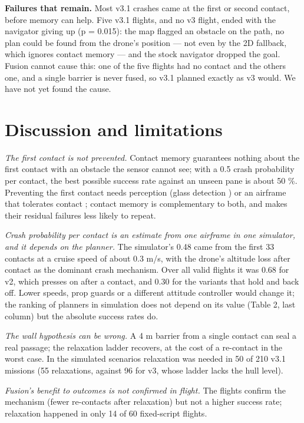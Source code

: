\documentclass[
]{article}
\begin{document}
\textbf{Failures that remain.} Most v3.1 crashes came at the first or
second contact, before memory can help. Five v3.1 flights, and no v3
flight, ended with the navigator giving up (p = 0.015): the map flagged
an obstacle on the path, no plan could be found from the drone's
position --- not even by the 2D fallback, which ignores contact memory
--- and the stock navigator dropped the goal. Fusion cannot cause this:
one of the five flights had no contact and the others one, and a single
barrier is never fused, so v3.1 planned exactly as v3 would. We have not
yet found the cause.

\section{Discussion and limitations}\label{discussion-and-limitations}

\emph{The first contact is not prevented.} Contact memory guarantees
nothing about the first contact with an obstacle the sensor cannot see;
with a 0.5 crash probability per contact, the best possible success rate
against an unseen pane is about 50 \%. Preventing the first contact
needs perception (glass detection \autocite{mei2020glass}) or an
airframe that tolerates contact \autocite{briod2014gimball}; contact
memory is complementary to both, and makes their residual failures less
likely to repeat.

\emph{Crash probability per contact is an estimate from one airframe in
one simulator, and it depends on the planner.} The simulator's 0.48 came
from the first 33 contacts at a cruise speed of about 0.3 m/s, with the
drone's altitude loss after contact as the dominant crash mechanism.
Over all valid flights it was 0.68 for v2, which presses on after a
contact, and 0.30 for the variants that hold and back off. Lower speeds,
prop guards or a different attitude controller would change it; the
ranking of planners in simulation does not depend on its value (Table 2,
last column) but the absolute success rates do.

\emph{The wall hypothesis can be wrong.} A 4 m barrier from a single
contact can seal a real passage; the relaxation ladder recovers, at the
cost of a re-contact in the worst case. In the simulated scenarios
relaxation was needed in 50 of 210 v3.1 missions (55 relaxations,
against 96 for v3, whose ladder lacks the hull level).

\emph{Fusion's benefit to outcomes is not confirmed in flight.} The
flights confirm the mechanism (fewer re-contacts after relaxation) but
not a higher success rate; relaxation happened in only 14 of 60
fixed-script flights.
\end{document}
